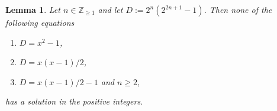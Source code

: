 \documentclass[11pt]{amsart}
\theoremstyle{plain}
\newtheorem{lem}[thm]{Lemma}
\theoremstyle{definition}
\numberwithin{thm}{section}
\numberwithin{equation}{thm}
\newcommand{\Tr}{{\rm Tr}}
\newcommand{\eps}{\epsilon}
\newcommand{\R}{{\mathbb R}}
\newcommand{\Z}{{\mathbb Z}}
\newcommand{\0}{\emptyset}
\newcommand{\id}{{\rm id}}
\newcommand{\ZB}{{\mathbf Z}}
\begin{document}
%

\begin{lem}\label{eqns}
Let $n \in \Z_{\geq 1}$ and let $D := 2^n(2^{2n+1}-1)$. Then none of the following equations
\begin{enumerate}[\rm(i)]
\item $D=x^2-1$,
\item $D= x(x-1)/2$,
\item $D= x(x-1)/2-1$ and $n \geq 2$,
\end{enumerate}
has a solution in the positive integers.
\end{lem}
\end{document}

